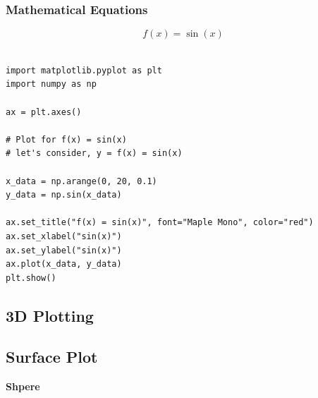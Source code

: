 \documentclass{book}
\begin{document}
\subsubsection{Mathematical Equations}
\begin{equation}
	f(x) = \sin(x)
\end{equation}
\begin{verbatim}
   
import matplotlib.pyplot as plt
import numpy as np

ax = plt.axes()

# Plot for f(x) = sin(x)
# let's consider, y = f(x) = sin(x)

x_data = np.arange(0, 20, 0.1)
y_data = np.sin(x_data)

ax.set_title("f(x) = sin(x)", font="Maple Mono", color="red")
ax.set_xlabel("sin(x)")
ax.set_ylabel("sin(x)")
ax.plot(x_data, y_data)
plt.show()

\end{verbatim}

\subsection{3D Plotting}
\subsection{Surface Plot}
\textbf{Shpere}
\end{document}
